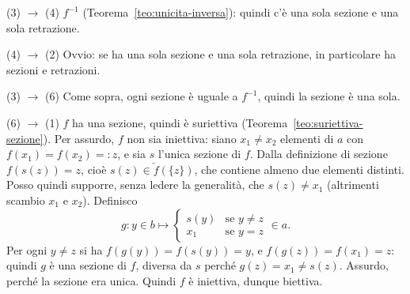 \begin{concetto}
\begin{dimostrazione}
\begin{caso}{(3) $\rightarrow$ (4)}
        $f^{-1}$ (Teorema~\ref{teo:unicita-inversa}): quindi c'è una sola sezione e una sola retrazione.
    \end{caso}
    \begin{caso}{(4) $\rightarrow$ (2)}
        Ovvio: se ha una sola sezione e una sola retrazione, in particolare ha sezioni e retrazioni.
    \end{caso}
    \begin{caso}{(3) $\rightarrow$ (6)}
        Come sopra, ogni sezione è uguale a $f^{-1}$, quindi la sezione è una sola.
    \end{caso}
    \begin{caso}{(6) $\rightarrow$ (1)}
    $f$ ha una sezione, quindi è suriettiva (Teorema~\ref{teo:suriettiva-sezione}).
    Per assurdo, $f$ non sia iniettiva: siano $x_1 \neq x_2$ elementi di $a$ con $f(x_1) = f(x_2) =: z$, e sia $s$ l'unica sezione di $f$.
    Dalla definizione di sezione $f(s(z)) = z$, cioè $s(z) \in \overleftarrow{f}(\{z\})$, che contiene almeno due elementi distinti.
    Posso quindi supporre, senza ledere la generalità, che $s(z) \neq x_1$ (altrimenti scambio $x_1$ e $x_2$). Definisco
    \[ g \colon y \in b \mapsto \begin{cases} s(y) & \text{se } y \neq z \\ x_1 & \text{se } y = z \end{cases} \in a. \]
    Per ogni $y \neq z$ si ha $f(g(y)) = f(s(y)) = y$, e $f(g(z)) = f(x_1) = z$: quindi $g$ è una sezione di $f$, diversa da $s$
    perché $g(z) = x_1 \neq s(z)$. Assurdo, perché la sezione era unica. Quindi $f$ è iniettiva, dunque biettiva.
    \end{caso}
\end{dimostrazione}
\end{concetto}

